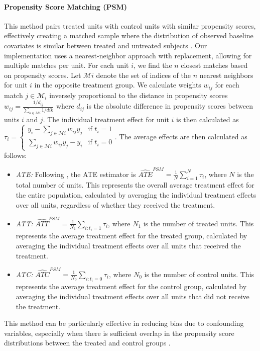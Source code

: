 \documentclass{article}
\begin{document}
\paragraph{Propensity Score Matching (PSM)} This method pairs treated units with control units with similar propensity scores, effectively creating a matched sample where the distribution of observed baseline covariates is similar between treated and untreated subjects \citep{austin2011introduction}. Our implementation uses a nearest-neighbor approach with replacement, allowing for multiple matches per unit. For each unit $i$, we find the $n$ closest matches based on propensity scores. Let $\mathcal{M}i$ denote the set of indices of the $n$ nearest neighbors for unit $i$ in the opposite treatment group. We calculate weights $w_{ij}$ for each match $j \in \mathcal{M}_i$ inversely proportional to the distance in propensity scores 
$w_{ij} = \frac{1/d_{ij}}{\sum_{k \in \mathcal{M}i} 1/d{ik}}$
where $d_{ij}$ is the absolute difference in propensity scores between units $i$ and $j$. The individual treatment effect for unit $i$ is then calculated as
$\tau_i = \begin{cases}
y_i - \sum_{j \in \mathcal{M}i} w_{ij}y_j & \text{if } t_i = 1 \\
\sum_{j \in \mathcal{M}i} w_{ij}y_j - y_i & \text{if } t_i = 0
\end{cases}
$.
The average effects are then calculated as follows:
\begin{itemize}
\item \textit{ATE:} Following \citet{basu2023understanding}, the ATE estimator is $\widehat{ATE}^{PSM} = \frac{1}{N} \sum_{i=1}^N \tau_i$, where $N$ is the total number of units. This represents the overall average treatment effect for the entire population, calculated by averaging the individual treatment effects over all units, regardless of whether they received the treatment.

\item \textit{ATT:} $\widehat{ATT}^{PSM} = \frac{1}{N_1} \sum_{i:t_i=1} \tau_i$, where $N_1$ is the number of treated units. This represents the average treatment effect for the treated group, calculated by averaging the individual treatment effects over all units that received the treatment.

\item \textit{ATC:} $\widehat{ATC}^{PSM} = \frac{1}{N_0} \sum_{i:t_i=0} \tau_i$, where $N_0$ is the number of control units. This represents the average treatment effect for the control group, calculated by averaging the individual treatment effects over all units that did not receive the treatment.

\end{itemize}
This method can be particularly effective in reducing bias due to confounding variables, especially when there is sufficient overlap in the propensity score distributions between the treated and control groups \citep{rosenbaum1983central}.
\end{document}

